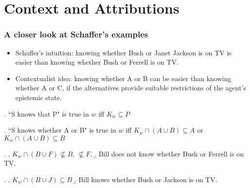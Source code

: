\section{Context and Attributions}

\begin{frame}

\frametitle{A closer look at Schaffer's examples}

\begin{itemize}

\item Schaffer's intuition: knowing whether Bush or Janet Jackson is
on TV is easier than knowing whether Bush or Ferrell is on
TV.\pause

\item Contextualist idea: knowing whether A or B can be easier than
knowing whether A or C, if the alternatives provide suitable
\alert{restrictions} of the agent's epistemic state.\pause

\end{itemize}

\ex. ``S knows that P" is true in $w$ iff $K_w \subseteq P$\pause

\ex. \label{wh} ``S knows whether A or B" is true in $w$ iff
$K_{w}\cap(A \cup B) \subseteq A$ or $K_{w}\cap(A \cup B)
\subseteq B$



\end{frame}


\begin{frame}

 \pause

\ex. \a. $K_{w} \cap (B \cup F) \nsubseteq B$, $\nsubseteq F$. \b.
Bill does not know whether Bush or Ferrell is on TV.\pause

\ex. \a. $K_{w} \cap (B \cup J) \subseteq B$ \b. Bill knows
whether Bush or Jackson is on TV.

\end{frame}



